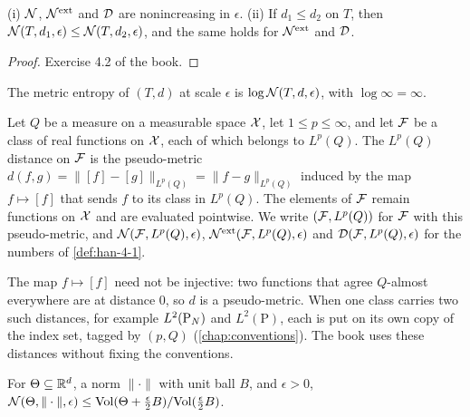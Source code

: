 \begin{lemma}
  \label{lem:han-4-1}
  (i) $\mathcal{N}$, $\mathcal{N}^{\mathrm{ext}}$ and $\mathcal{D}$ are nonincreasing in $\epsilon$. (ii) If $d_1\le d_2$ on $T$, then $\mathcal{N}(T,d_1,\epsilon)\le\mathcal{N}(T,d_2,\epsilon)$, and the same holds for $\mathcal{N}^{\mathrm{ext}}$ and $\mathcal{D}$.
\end{lemma}
\begin{proof}
  Exercise 4.2 of the book.
\end{proof}

\begin{definition}
  \label{def:han-4-2}
  The metric entropy of $(T,d)$ at scale $\epsilon$ is $\log\mathcal{N}(T,d,\epsilon)$, with $\log\infty=\infty$.
\end{definition}

\begin{definition}
  \label{def:lp-class-pseudometric}
  Let $Q$ be a measure on a measurable space $\mathcal{X}$, let $1\le p\le\infty$, and let $\mathcal{F}$ be a class of real functions on $\mathcal{X}$, each of which belongs to $L^p(Q)$. The $L^p(Q)$ distance on $\mathcal{F}$ is the pseudo-metric $d(f,g)=\bigl\|[f]-[g]\bigr\|_{L^p(Q)}=\|f-g\|_{L^p(Q)}$ induced by the map $f\mapsto[f]$ that sends $f$ to its class in $L^p(Q)$. The elements of $\mathcal{F}$ remain functions on $\mathcal{X}$ and are evaluated pointwise. We write $(\mathcal{F},L^p(Q))$ for $\mathcal{F}$ with this pseudo-metric, and $\mathcal{N}(\mathcal{F},L^p(Q),\epsilon)$, $\mathcal{N}^{\mathrm{ext}}(\mathcal{F},L^p(Q),\epsilon)$ and $\mathcal{D}(\mathcal{F},L^p(Q),\epsilon)$ for the numbers of \cref{def:han-4-1}.
\end{definition}
\begin{remark}
  The map $f\mapsto[f]$ need not be injective: two functions that agree $Q$-almost everywhere are at distance $0$, so $d$ is a pseudo-metric. When one class carries two such distances, for example $L^2(\mathrm{P}_N)$ and $L^2(\mathrm P)$, each is put on its own copy of the index set, tagged by $(p,Q)$ (\cref{chap:conventions}). The book uses these distances without fixing the conventions.
\end{remark}

\begin{lemma}
  \label{lem:han-ex-4-1-volume}
  For $\Theta\subseteq\mathbb{R}^d$, a norm $\|\cdot\|$ with unit ball $B$, and $\epsilon>0$,
  $\mathcal{N}(\Theta,\|\cdot\|,\epsilon)\le\mathrm{Vol}(\Theta+\tfrac\epsilon2B)/\mathrm{Vol}(\tfrac\epsilon2B)$.
\end{lemma}

